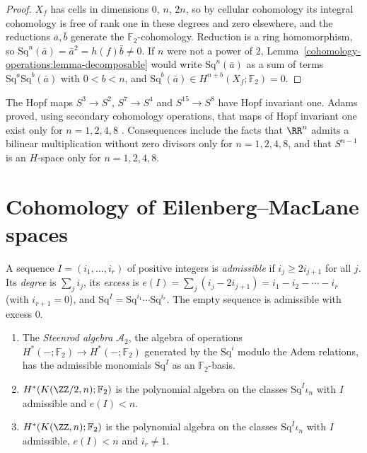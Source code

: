 \begin{proof}
$X_f$ has cells in dimensions $0$, $n$, $2n$, so by cellular cohomology its integral cohomology is free of rank one in these degrees and zero elsewhere, and the reductions
$\bar{a}, \bar{b}$ generate the $\mathbb{F}_2$-cohomology. Reduction is a ring homomorphism, so $\mathrm{Sq}^n(\bar a) = \bar a^2 = h(f)\bar b \neq 0$. If $n$ were not a power of $2$,
Lemma~\ref{cohomology-operations:lemma-decomposable} would write $\mathrm{Sq}^n(\bar a)$ as a sum of terms $\mathrm{Sq}^a\mathrm{Sq}^b(\bar a)$ with $0 < b < n$, and
$\mathrm{Sq}^b(\bar a) \in H^{n+b}(X_f; \mathbb{F}_2) = 0$.
\end{proof}

\begin{remark}\label{cohomology-operations:remark-adams}
The Hopf maps $S^3 \to S^2$, $S^7 \to S^4$ and $S^{15} \to S^8$ have Hopf invariant one. Adams proved, using secondary cohomology operations, that maps of Hopf invariant
one exist only for $n = 1, 2, 4, 8$ \cite{adams-1960}. Consequences include the facts that $\RR^n$ admits a bilinear
multiplication without zero divisors only for $n = 1, 2, 4, 8$, and that $S^{n-1}$ is an $H$-space only for $n = 1, 2, 4, 8$.
\end{remark}

\section{Cohomology of Eilenberg--MacLane spaces}\label{cohomology-operations:section-cohomology-km}

\begin{definition}\label{cohomology-operations:definition-admissible}
A sequence $I = (i_1, \ldots, i_r)$ of positive integers is \emph{admissible} if $i_j \geq 2i_{j+1}$ for all $j$. Its \emph{degree} is $\sum_j i_j$, its \emph{excess} is
$e(I) = \sum_j(i_j - 2i_{j+1}) = i_1 - i_2 - \cdots - i_r$ (with $i_{r+1} = 0$), and $\mathrm{Sq}^I = \mathrm{Sq}^{i_1} \cdots \mathrm{Sq}^{i_r}$. The empty sequence is admissible with
excess $0$.
\end{definition}

\begin{theorem}[Serre]\label{cohomology-operations:theorem-serre}
\begin{enumerate}
\item The \emph{Steenrod algebra} $\mathcal{A}_2$, the algebra of operations $H^*(-; \mathbb{F}_2) \to H^*(-; \mathbb{F}_2)$ generated by the $\mathrm{Sq}^i$ modulo the Adem relations, has
the admissible monomials $\mathrm{Sq}^I$ as an $\mathbb{F}_2$-basis.
\item $H^*(K(\ZZ/2, n); \mathbb{F}_2)$ is the polynomial algebra on the classes $\mathrm{Sq}^I\iota_n$ with $I$ admissible and $e(I) < n$.
\item $H^*(K(\ZZ, n); \mathbb{F}_2)$ is the polynomial algebra on the classes $\mathrm{Sq}^I\iota_n$ with $I$ admissible, $e(I) < n$ and $i_r \neq 1$.
\end{enumerate}
\end{theorem}

